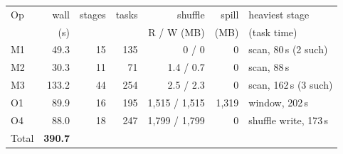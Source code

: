 \documentclass[sigconf]{acmart}
\begin{document}
\par\medskip\noindent\begin{minipage}{\columnwidth}
\centering\footnotesize\setlength{\tabcolsep}{3pt}
\label{tab:linux-baseline}
\begin{tabular}{lrrrrrl}
\toprule
Op & wall & stages & tasks & shuffle & spill & heaviest stage \\
   & (s)  &        &       & R / W (MB) & (MB)  & (task time) \\
\midrule
M1 & 49.3 & 15 & 135 & 0 / 0 & 0 & scan, 80\,s (2 such) \\
M2 & 30.3 & 11 & 71 & 1.4 / 0.7 & 0 & scan, 88\,s \\
M3 & 133.2 & 44 & 254 & 2.5 / 2.3 & 0 & scan, 162\,s (3 such) \\
O1 & 89.9 & 16 & 195 & 1{,}515 / 1{,}515 & 1{,}319 & window, 202\,s \\
O4 & 88.0 & 18 & 247 & 1{,}799 / 1{,}799 & 0 & shuffle write, 173\,s \\
\midrule
Total & \textbf{390.7} & & & & & \\
\bottomrule
\end{tabular}
\end{minipage}
\end{document}
